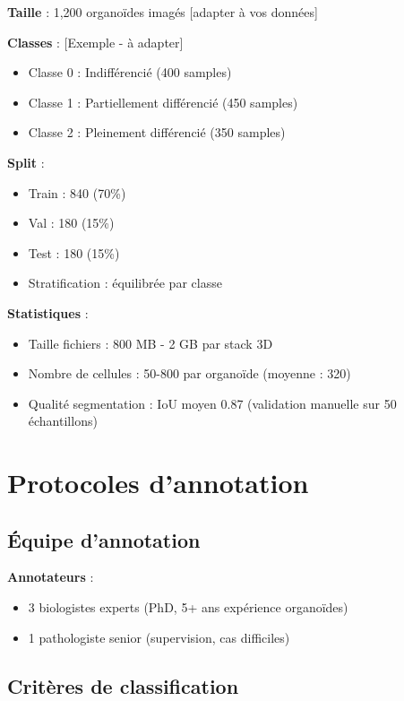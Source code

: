 \textbf{Taille} : 1,200 organoïdes imagés [adapter à vos données]

\textbf{Classes} : [Exemple - à adapter]
\begin{itemize}
    \item Classe 0 : Indifférencié (400 samples)
    \item Classe 1 : Partiellement différencié (450 samples)
    \item Classe 2 : Pleinement différencié (350 samples)
\end{itemize}

\textbf{Split} :
\begin{itemize}
    \item Train : 840 (70\%)
    \item Val : 180 (15\%)
    \item Test : 180 (15\%)
    \item Stratification : équilibrée par classe
\end{itemize}

\textbf{Statistiques} :
\begin{itemize}
    \item Taille fichiers : 800 MB - 2 GB par stack 3D
    \item Nombre de cellules : 50-800 par organoïde (moyenne : 320)
    \item Qualité segmentation : IoU moyen 0.87 (validation manuelle sur 50 échantillons)
\end{itemize}

\section{Protocoles d'annotation}

\subsection{Équipe d'annotation}

\textbf{Annotateurs} :
\begin{itemize}
    \item 3 biologistes experts (PhD, 5+ ans expérience organoïdes)
    \item 1 pathologiste senior (supervision, cas difficiles)
\end{itemize}

\subsection{Critères de classification}

